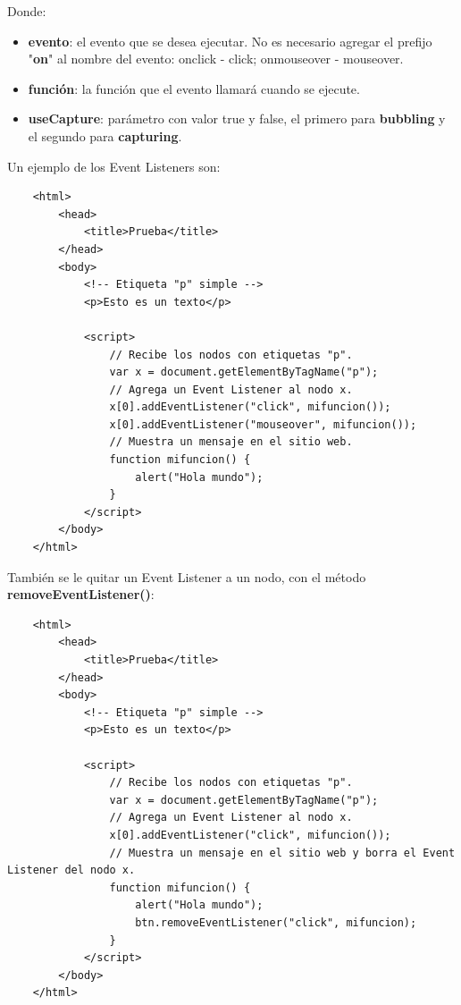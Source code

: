 Donde:
\begin{itemize}
    \item \textbf{evento}: el evento que se desea ejecutar. No es necesario agregar el prefijo "\textbf{on}" al nombre del evento: onclick - click; onmouseover - mouseover.
    \item \textbf{función}: la función que el evento llamará cuando se ejecute.
    \item \textbf{useCapture}: parámetro con valor true y false, el primero para \textbf{bubbling} y el segundo para \textbf{capturing}.
\end{itemize}

Un ejemplo de los Event Listeners son:

\begin{lstlisting}
    <html>
        <head>
            <title>Prueba</title>
        </head>
        <body>
            <!-- Etiqueta "p" simple -->
            <p>Esto es un texto</p>
            
            <script>
                // Recibe los nodos con etiquetas "p".
                var x = document.getElementByTagName("p");
                // Agrega un Event Listener al nodo x.
                x[0].addEventListener("click", mifuncion());
                x[0].addEventListener("mouseover", mifuncion());
                // Muestra un mensaje en el sitio web.
                function mifuncion() {
                    alert("Hola mundo");
                }
            </script>
        </body>
    </html>
\end{lstlisting}

También se le quitar un Event Listener a un nodo, con el método \textbf{removeEventListener()}:
\begin{lstlisting}
    <html>
        <head>
            <title>Prueba</title>
        </head>
        <body>
            <!-- Etiqueta "p" simple -->
            <p>Esto es un texto</p>
            
            <script>
                // Recibe los nodos con etiquetas "p".
                var x = document.getElementByTagName("p");
                // Agrega un Event Listener al nodo x.
                x[0].addEventListener("click", mifuncion());
                // Muestra un mensaje en el sitio web y borra el Event Listener del nodo x.
                function mifuncion() {
                    alert("Hola mundo");
                    btn.removeEventListener("click", mifuncion);
                }
            </script>
        </body>
    </html>
\end{lstlisting}


